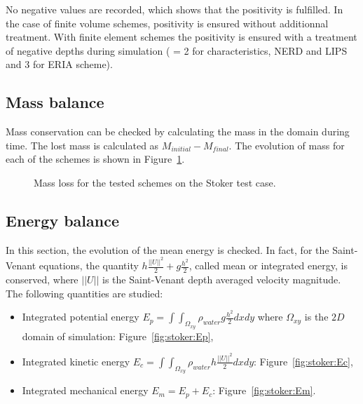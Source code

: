No negative values are recorded, which shows that the positivity is fulfilled.
In the case of finite volume schemes, positivity is ensured without additionnal
treatment.
With finite element schemes the positivity is ensured with a treatment of
negative depths during simulation ( = 2 for
characteristics, NERD and LIPS and 3 for ERIA scheme).

\subsection{Mass balance}

Mass conservation can be checked by calculating the mass in the domain during time.
The lost mass is calculated as $M_{initial} - M_{final}$.
The evolution of mass for each of the schemes is shown in
Figure~\ref{fig:stoker:VoLTime}.

\begin{figure}[H]
\centering
  \caption{Mass loss for the tested schemes on the Stoker test case.}
\label{fig:stoker:VoLTime}
\end{figure}

\subsection{Energy balance}

In this section, the evolution of the mean energy is checked.
In fact, for the Saint-Venant equations, 
the quantity $h \frac{||U||^2}{2} + g \frac{h^2}{2}$, called mean or integrated
energy, is conserved,
where $||U||$ is the Saint-Venant depth averaged velocity magnitude.
The following quantities are studied:
\begin{itemize}
\item Integrated potential energy
  \textbf{$E_p =\int\int_{\Omega_{xy}}\rho_{water} g \frac{h^2}{2} dxdy$} where
  $\Omega_{xy}$ is the $2D$ domain of simulation: Figure~\ref{fig:stoker:Ep},
\item Integrated kinetic energy
  \textbf{$E_c =\int\int_{\Omega_{xy}} \rho_{water} h \frac{||U||^2}{2} dxdy$}:
  Figure~\ref{fig:stoker:Ec},
\item Integrated mechanical energy \textbf{$E_m = E_p + E_c$}:
  Figure~\ref{fig:stoker:Em}.
\end{itemize}

